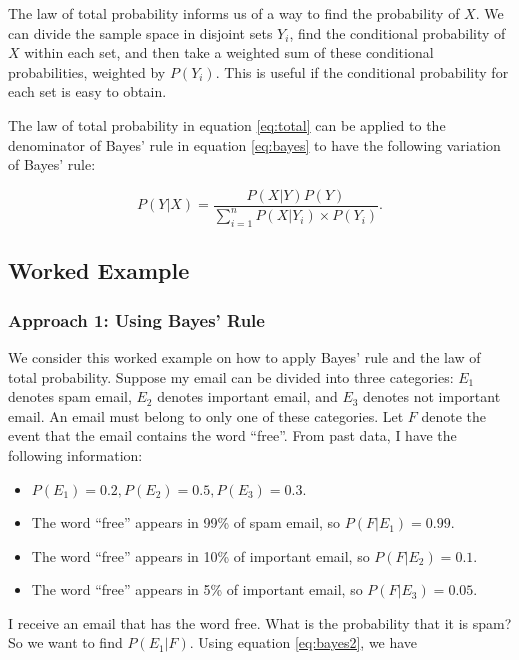 \documentclass[
]{book}
\providecommand{\tightlist}{%
  \setlength{\itemsep}{0pt}\setlength{\parskip}{0pt}}
\begin{document}
The law of total probability informs us of a way to find the probability of \(X\). We can divide the sample space in disjoint sets \(Y_i\), find the conditional probability of \(X\) within each set, and then take a weighted sum of these conditional probabilities, weighted by \(P(Y_i)\). This is useful if the conditional probability for each set is easy to obtain.

The law of total probability in equation \eqref{eq:total} can be applied to the denominator of Bayes' rule in equation \eqref{eq:bayes} to have the following variation of Bayes' rule:

\begin{equation} 
P(Y|X) = \frac{P(X|Y)P(Y)}{\sum_{i=1}^n P(X|Y_i) \times P(Y_i)}.
\label{eq:bayes2}
\end{equation}

\subsection{Worked Example}\label{worked-example}

\subsubsection{Approach 1: Using Bayes' Rule}\label{approach-1-using-bayes-rule}

We consider this worked example on how to apply Bayes' rule and the law of total probability. Suppose my email can be divided into three categories: \(E_1\) denotes spam email, \(E_2\) denotes important email, and \(E_3\) denotes not important email. An email must belong to only one of these categories. Let \(F\) denote the event that the email contains the word ``free''. From past data, I have the following information:

\begin{itemize}
\tightlist
\item
  \(P(E_1) = 0.2, P(E_2) = 0.5, P(E_3) = 0.3\).
\item
  The word ``free'' appears in 99\% of spam email, so \(P(F|E_1) = 0.99\).
\item
  The word ``free'' appears in 10\% of important email, so \(P(F|E_2) = 0.1\).
\item
  The word ``free'' appears in 5\% of important email, so \(P(F|E_3) = 0.05\).
\end{itemize}

I receive an email that has the word free. What is the probability that it is spam? So we want to find \(P(E_1|F)\). Using equation \eqref{eq:bayes2}, we have
\end{document}
